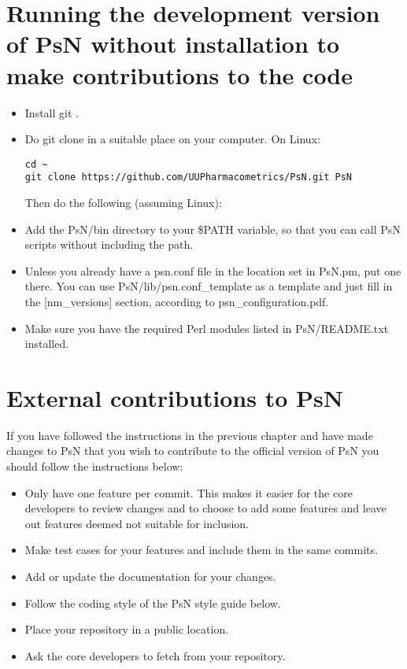 \section{Running the development version of PsN without installation to make contributions to the code}
\begin{itemize}
\item Install git \cite{git}.
\item Do git clone in a suitable place on your computer. On Linux:
\begin{verbatim}
cd ~
git clone https://github.com/UUPharmacometrics/PsN.git PsN

\end{verbatim}
\noindent Then do the following (assuming Linux):
\item Add the PsN/bin directory to your \$PATH variable, so that you can call PsN scripts without including the path.
\item Unless you already have a psn.conf file in the location set in PsN.pm, put one there.
You can use PsN/lib/psn.conf\_template as a template and just fill in the [nm\_versions] section,
according to psn\_configuration.pdf.
\item Make sure you have the required Perl modules listed in PsN/README.txt installed.
\end{itemize}

\section{External contributions to PsN}
If you have followed the instructions in the previous chapter and have made changes to PsN that you wish to contribute
to the official version of PsN you should follow the instructions below:

\begin{itemize}
    \item Only have one feature per commit. This makes it easier for the core developers to review changes and to choose to add some features and leave out features deemed not suitable for inclusion.
    \item Make test cases for your features and include them in the same commits.
    \item Add or update the documentation for your changes.
    \item Follow the coding style of the PsN style guide below.
    \item Place your repository in a public location.
    \item Ask the core developers to fetch from your repository.
\end{itemize}


